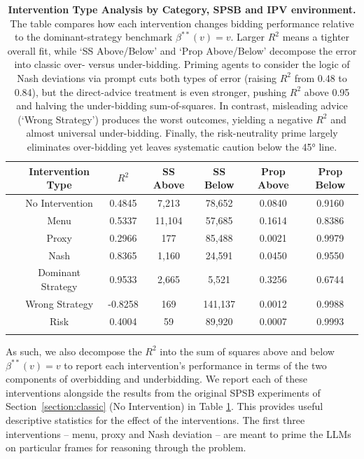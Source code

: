 \documentclass{article} %
\begin{document}
\begin{table}[h]
\centering
\begin{tabular}{l c c c c c c}
\toprule
 & \textbf{Intervention Type} & \textbf{$R^2$} & \textbf{SS Above} & \textbf{SS Below} & \textbf{Prop Above} & \textbf{Prop Below} \\
\midrule
\addlinespace[0.5em]
 & No Intervention & 0.4845 & 7,213 & 78,652 & 0.0840 & 0.9160 \\
\addlinespace[0.5em]
\midrule
\addlinespace[0.5em]
\multirow{3}{*}{\textbf{Priming}} & Menu & 0.5337 & 11,104 & 57,685 & 0.1614 & 0.8386 \\
 & Proxy & 0.2966 & 177 & 85,488 & 0.0021 & 0.9979 \\
 & Nash & 0.8365 & 1,160 & 24,591 & 0.0450 & 0.9550 \\
\addlinespace[0.5em]
\midrule
\addlinespace[0.5em]
\multirow{2}{*}{\textbf{Advice}} & Dominant Strategy & 0.9533 & 2,665 & 5,521 & 0.3256 & 0.6744 \\
 & Wrong Strategy & -0.8258 & 169 & 141,137 & 0.0012 & 0.9988 \\
\addlinespace[0.5em]
\midrule
\addlinespace[0.5em]
\multirow{1}{*}{\textbf{Behavioral}} & Risk & 0.4004 & 59 & 89,920 & 0.0007 & 0.9993 \\
\addlinespace[0.5em]
\bottomrule
\end{tabular}
\caption{\textbf{Intervention Type Analysis by Category, SPSB and IPV environment.} 
The table compares how each intervention changes bidding performance relative to the dominant-strategy benchmark $\beta^{**}(v) = v$. Larger $R^2$ means a tighter overall fit, while ‘SS Above/Below’ and ‘Prop Above/Below’ decompose the error into classic over- versus under-bidding. Priming agents to consider the logic of Nash deviations via prompt cuts both types of error (raising $R^2$ from 0.48 to 0.84), but the direct-advice treatment is even stronger, pushing $R^2$ above 0.95 and halving the under-bidding sum-of-squares. In contrast, misleading advice (‘Wrong Strategy’) produces the worst outcomes, yielding a negative $R^2$ and almost universal under-bidding. Finally, the risk-neutrality prime largely eliminates over-bidding yet leaves systematic caution below the 45° line.}
\label{tab:intervention_analysis}
\end{table}


As such, we also decompose the $R^2$ into the sum of squares above and below $\beta^{**}(v) = v$ to report each intervention's performance in terms of
the two components of overbidding and underbidding. We report each of these interventions alongside the results from the original SPSB experiments of Section~\ref{section:classic} (No Intervention) in Table \ref{tab:intervention_analysis}.
%
This provides useful descriptive statistics for the effect of the interventions. The first three interventions -- menu, proxy and Nash deviation -- are meant to prime the LLMs on particular frames for reasoning through the problem.
\end{document}
